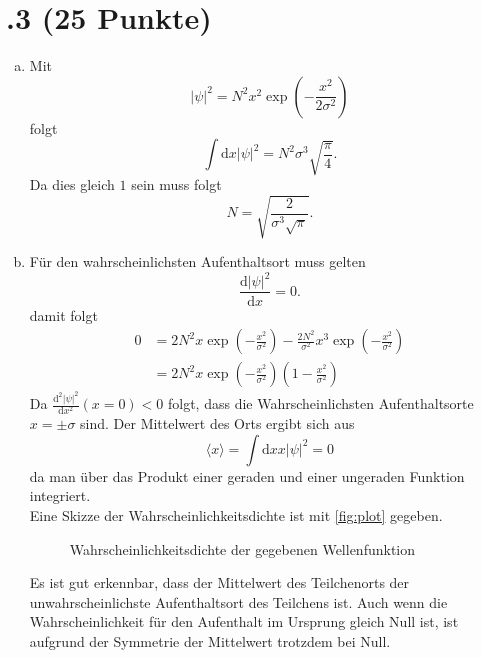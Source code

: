 \section*{\nr.3 \titthree (25 Punkte)}
\begin{enumerate}[(a)]
\item Mit 
\begin{equation}
  |\psi|^2=N^2x^2\exp\left(-\frac{x^2}{2\sigma^2}\right)
\end{equation}
folgt
\begin{equation}
  \int \mathrm{d}x |\psi|^2=N^2\sigma^3\sqrt{\frac{\pi}{4}}.
\end{equation}
Da dies gleich $1$ sein muss folgt
\begin{equation}
  N=\sqrt{\frac{2}{\sigma^3\sqrt{\pi}}}.
\end{equation}
\item Für den wahrscheinlichsten Aufenthaltsort muss gelten
\begin{equation}
  \frac{\mathrm{d}|\psi|^2}{\mathrm{d}x}=0.
\end{equation}
damit folgt
\begin{align}
  0&=2 N^2 x\exp\left(-\frac{x^2}{\sigma^2}\right) -\frac{2N^2}{\sigma^2}x^3\exp\left(-\frac{x^2}{\sigma^2}\right)\\
  &=2N^2x\exp\left(-\frac{x^2}{\sigma^2}\right)\left(1-\frac{x^2}{\sigma^2}\right)
\end{align}
Da $\frac{\mathrm{d}^2|\psi|^2}{\mathrm{d}x^2}(x=0)<0$ folgt, dass die Wahrscheinlichsten Aufenthaltsorte $x=\pm \sigma$ sind.
Der Mittelwert des Orts ergibt sich aus
\begin{equation}
  \langle x \rangle = \int \mathrm{d}x x|\psi|^2=0
\end{equation}
da man über das Produkt einer geraden und einer ungeraden Funktion integriert.\\
Eine Skizze der Wahrscheinlichkeitsdichte ist mit \vref{fig:plot} gegeben.
\begin{figure}[htbp]
\centering

\caption{Wahrscheinlichkeitsdichte der gegebenen Wellenfunktion}
\label{fig:plot}
\end{figure}

Es ist gut erkennbar, dass der Mittelwert des Teilchenorts der unwahrscheinlichste Aufenthaltsort des Teilchens ist. Auch wenn die Wahrscheinlichkeit für den Aufenthalt im Ursprung gleich Null ist, ist aufgrund der Symmetrie der Mittelwert trotzdem bei Null.

\end{enumerate}